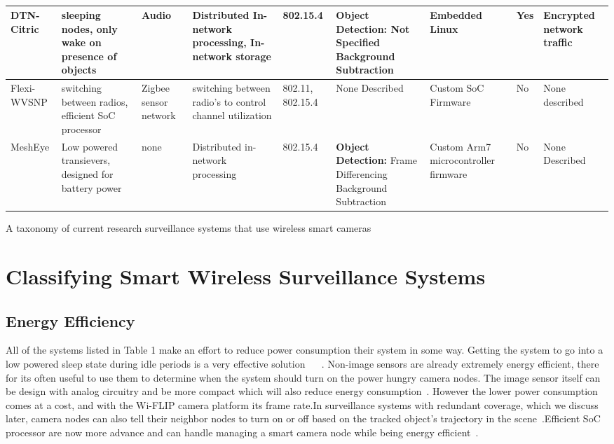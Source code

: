 \documentclass[journal,transmag]{IEEEtran}
\begin{document}
\begin{table}[t]
\begin{tabular}{| p{1.1cm} | p{2cm} | p{1.2cm}  | p{2.1cm} | p{1cm} | p{2.5cm} | p{1.5cm} | p{1.3cm}  | p{2cm} |}
    DTN-Citric & sleeping nodes, only wake on presence of objects & Audio & Distributed In-network processing, In-network storage  & 802.15.4 
    	& \textbf{Object Detection:} Not Specified Background Subtraction & Embedded Linux  & Yes & Encrypted network traffic  \\ \hline
    
    Flexi-WVSNP & switching between radios, efficient SoC processor & Zigbee sensor network  & switching between radio's to control channel utilization  
    	& 802.11, 802.15.4 & None Described & Custom SoC Firmware & No & None described  \\ \hline
    
    MeshEye & Low powered transievers, designed for battery power & none & Distributed in-network processing   & 802.15.4 
    	& \textbf{Object Detection:} Frame Differencing Background Subtraction & Custom Arm7 microcontroller firmware & No & None Described  \\ \hline


  \end{tabular}
  \caption{}{A taxonomy of current research surveillance systems that use wireless smart cameras}
  \label{tab:1}
\end{table}



\section{Classifying Smart Wireless Surveillance Systems}

\subsection{Energy Efficiency}
All of the systems listed in Table 1 make an effort to reduce power consumption their system in some way. Getting the system to go into a low powered 
sleep state during idle periods is a very effective solution ~\cite{AccLatEnergy} ~\cite{Citric}. Non-image sensors are already extremely energy efficient, 
there for its often useful to use them to determine when the system should turn on the power hungry camera nodes. The image sensor itself can be design with
analog circuitry and be more compact which will also reduce energy consumption~\cite{WiFLIP}. However the lower power consumption comes at a cost, and with
the Wi-FLIP camera platform its frame rate.In surveillance systems with redundant coverage, which we discuss later, camera nodes can also tell their neighbor
nodes to turn on or off based on the tracked object's trajectory in the scene~\cite{SensEye}.Efficient SoC processor are now more advance and can handle
managing a smart camera node while being energy efficient~\cite{Flexi-WVSNP}.
\end{document}
